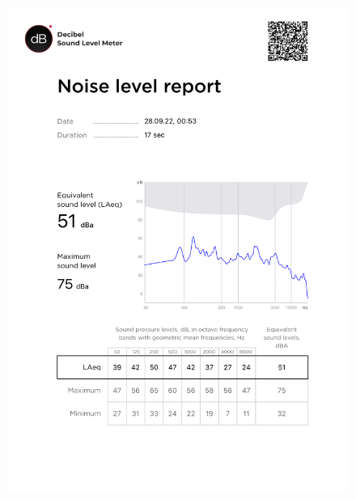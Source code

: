 \documentclass[a5paper, 12dd, twoside]{article}
\begin{document}
\begin{figure}[p]
    \centering
    \includegraphics[keepaspectratio, scale=0.6]{data/2.png}
\end{figure}
\end{document}
